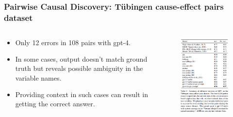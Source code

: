 \documentclass{beamer}
\begin{document}
\begin{frame}
	\frametitle{Pairwise Causal Discovery: T\"{u}bingen cause-effect pairs dataset}
	\begin{columns}
		\begin{column}{0.5 \textwidth}
			\begin{itemize}
				\item Only 12 errors in 108 pairs with gpt-4.
				\item In some cases, output doesn't match ground truth but reveals possible ambiguity in the variable names.
				\item Providing context in such cases can result in getting the correct answer. 
			\end{itemize}
		\end{column}
		\begin{column}{0.5 \textwidth}
			\begin{figure}
				\includegraphics[scale=0.4]{imgs/table2.png}
			\end{figure}
		\end{column}
	\end{columns}
\end{frame}
\end{document}
